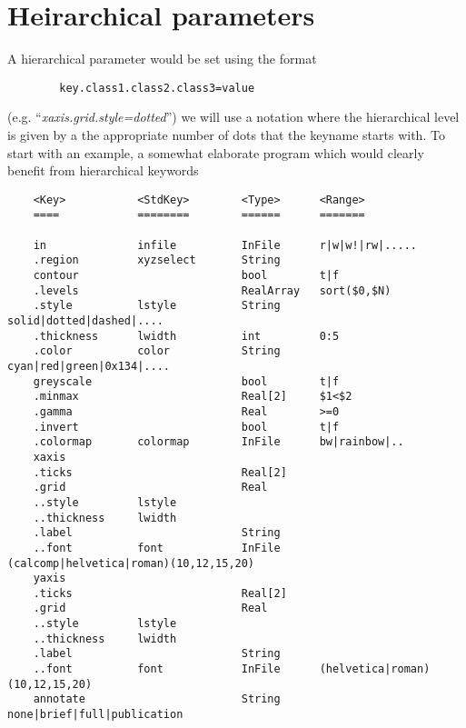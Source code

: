 \newpage
\section{Heirarchical parameters}
\label{s:hier}

A hierarchical parameter would be set using the format

\begin{verbatim}
        key.class1.class2.class3=value
\end{verbatim}

(e.g.  ``{\it xaxis.grid.style=dotted}'') we will use a notation where the 
hierarchical level is given by a the appropriate number of dots
that the keyname starts with. To start with an example, a somewhat
elaborate program which would clearly benefit from hierarchical
keywords

\footnotesize\begin{verbatim}
    <Key>           <StdKey>        <Type>      <Range>
    ====            ========        ======      =======

    in              infile          InFile      r|w|w!|rw|.....
    .region         xyzselect       String
    contour                         bool        t|f
    .levels                         RealArray   sort($0,$N)
    .style          lstyle          String      solid|dotted|dashed|....
    .thickness      lwidth          int         0:5
    .color          color           String      cyan|red|green|0x134|....
    greyscale                       bool        t|f
    .minmax                         Real[2]     $1<$2
    .gamma                          Real        >=0
    .invert                         bool        t|f
    .colormap       colormap        InFile      bw|rainbow|..
    xaxis
    .ticks                          Real[2]     
    .grid                           Real
    ..style         lstyle
    ..thickness     lwidth
    .label                          String
    ..font          font            InFile      (calcomp|helvetica|roman)(10,12,15,20)
    yaxis
    .ticks                          Real[2]     
    .grid                           Real
    ..style         lstyle
    ..thickness     lwidth
    .label                          String
    ..font          font            InFile      (helvetica|roman)(10,12,15,20)
    annotate                        String      none|brief|full|publication

\end{verbatim}\normalsize





